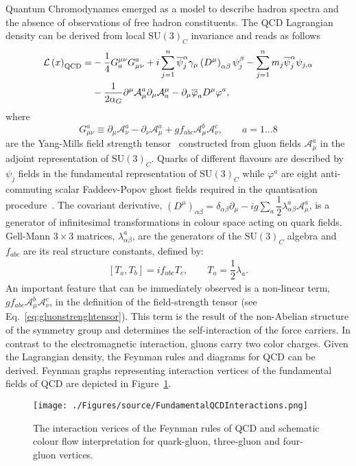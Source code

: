 Quantum Chromodynamcs emerged as a model to describe hadron spectra and the absence of observations of free hadron constituents. The QCD Lagrangian density can be derived from local $\mathrm{SU}\left(3\right)_{C}$ invariance and reads as follows
\begin{align}
 \mathcal{L}\left( x\right)_{\mathrm{QCD}}  = & -\dfrac{1}{4}G_a^{\mu\nu}G_{\mu\nu}^a + i\sum_{j=1}^n{\overline{\psi}^{\alpha}_j \gamma_\mu \left( D^\mu \right)_{\alpha\beta} \psi_j^\beta } - \sum_{j=1}^n{m_j\overline{\psi}^{\alpha}_j\psi_{j,\alpha}} \notag\\
					      & - \dfrac{1}{2\alpha_G} \partial^\mu \mathcal{A}^a_\mu \partial_\mu \mathcal{A}_a^\mu - \partial_\mu \overline{\varphi}_a D^\mu \varphi^a,
								\label{eq:qcdlagrangian}
\end{align}
where 
\begin{equation}
G_{\mu\nu}^a \equiv \partial_\mu \mathcal{A}^a_\nu - \partial_\nu \mathcal{A}^a_\mu + gf_{abc}\mathcal{A}^b_\mu \mathcal{A}^c_\nu , \qquad a=1 \ldots 8
\label{eq:gluonstrenghtensor}
\end{equation}
are the Yang-Mills field strength tensor~\cite{Yang:1954ek} constructed from gluon fields $\mathcal{A}^a_\mu$ in the adjoint representation of $\mathrm{SU}\left(3\right)_C$. Quarks of different flavours are described by $\psi_j$ fields in the fundamental representation of $\mathrm{SU}\left(3\right)_C$ while $\varphi^a$ are eight anti-commuting scalar Faddeev-Popov ghost fields required in the quantisation procedure~\cite{Faddeev:1967fc, DeWitt:1964yg}. The covariant derivative, $\left( D^\mu \right)_{\alpha\beta} = \delta_{\alpha\beta}\partial_\mu - ig\sum_a{\dfrac{1}{2}\lambda^a_{\alpha\beta}\mathcal{A}^a_\mu}$, is a generator of infinitesimal transformations in colour space acting on quark fields. Gell-Mann $3\times 3$ matrices, $\lambda^a_{\alpha\beta}$, are the generators of the $\mathrm{SU}\left(3\right)_C$ algebra and $f_{abc}$ are its real structure constants, defined by:
\begin{align}
 \left[T_a,T_b\right] = if_{abc}T_c,\qquad T_a = \dfrac{1}{2}\lambda_a.
\end{align}
An important feature that can be immediately observed is a non-linear term, $gf_{abc}\mathcal{A}^b_\mu \mathcal{A}^c_\nu$, in the definition of the field-strength tensor (see Eq.~\eqref{eq:gluonstrenghtensor}). This term is the result of the non-Abelian structure of the symmetry group and determines the self-interaction of the force carriers. In contrast to the electromagnetic interaction, gluons carry two color charges. Given the Lagrangian density, the Feynman rules and diagrams for QCD can be derived.  Feynman graphs representing interaction vertices of the fundamental fields of QCD are depicted in Figure~\ref{fig:FundamentalQCDInteractions}.
\begin{figure}[t]
	\centering
		\texttt{[image: ./Figures/source/FundamentalQCDInteractions.png]}
	\caption{The interaction verices of the Feynman rules of QCD and schematic colour flow interpretation for quark-gluon, three-gluon and four-gluon vertices.}
	\label{fig:FundamentalQCDInteractions}
\end{figure}

